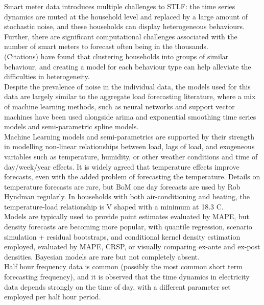 \documentclass[12pt,a4paper]{article}\usepackage[]{graphicx}\usepackage[]{color}
\begin{document}
Smart meter data introduces multiple challenges to STLF: the time series dynamics are muted at the household level and replaced by a large amount of stochastic noise, and these households can display heterogeneous behaviours. Further, there are significant computational challenges associated with the number of smart meters to forecast often being in the thousands.
\\

(Citations) have found that clustering households into groups of similar behaviour, and creating a model for each behaviour type can help alleviate the difficulties in heterogeneity.
\\

Despite the prevalence of noise in the individual data, the models used for this data are largely similar to the aggregate load forecasting literature, where a mix of machine learning methods, such as neural networks and support vector machines have been used alongside arima and exponential smoothing time series models and semi-parametric spline models.
\\

Machine Learning models and semi-parametrics are supported by their strength in modelling non-linear relationships between load, lags of load, and exogeneous variables such as temperature, humidity, or other weather conditions and time of day/week/year effects. It is widely agreed that temperature effects improve forecasts, even with the added problem of forecasting the temperature. Details on temperature forecasts are rare, but BoM one day forecasts are used by Rob Hyndman regularly. In households with both air-conditioning and heating, the temperature-load relationship is V shaped with a minimum at 18.3 C.
\\

Models are typically used to provide point estimates evaluated by MAPE, but density forecasts are becoming more popular, with quantile regression, scenario simulation + residual bootstraps, and conditional kernel density estimation employed, evaluated by MAPE, CRSP, or visually comparing ex-ante and ex-post densities. Bayesian models are rare but not completely absent.
\\

Half hour frequency data is common (possibly the most common short term forecasting frequency), and it is observed that the time dynamics in electricity data depends strongly on the time of day, with a different parameter set employed per half hour period.
\\
\end{document}
